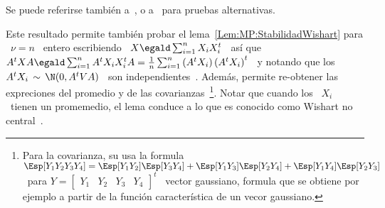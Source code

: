 %
Se    puede   referirse   tambi\'en    a~\cite{GupNag99,   And03,    Seb04},   o
a~\cite[Ej.~7.2]{BilBre99} para pruebas alternativas.

Este resultado  permite tambi\'en probar  el lema~\ref{Lem:MP:StabilidadWishart}
para \  $\nu = n$  \ entero  escribiendo \ $X  \egald \sum_{i=1}^n X_i  X_i^t$ \
as\'i que \ $A^t X A \egald  \sum_{i=1}^n A^t X_i X_i^t A = \frac1n \sum_{i=1}^n
\left( A^t X_i \right) \left( A^t X_i  \right)^t$ \ y notando que los \ $A^t X_i
\, \sim \, \N(0, A^t V A)$ \ son independientes~\cite{Seb04}.  Adem\'as, permite
re-obtener las  expreciones del promedio y de  las covarianzas~\footnote{Para la
  covarianza, su usa la formula \ $\Esp[Y_1 Y_2 Y_3 Y_4] = \Esp[Y_1 Y_2]\Esp[Y_3
  Y_4]  + \Esp[Y_1 Y_3]\Esp[Y_2  Y_4] +  \Esp[Y_1 Y_4]\Esp[Y_2  Y_3]$ \  para $Y
  = \begin{bmatrix}  Y_1 & Y_2 &  Y_3 & Y_4 \end{bmatrix}^t$  \ vector gaussiano,
  formula que se  obtiene por ejemplo a partir  de la funci\'on caracter\'istica
  de un vecor  gaussiano.}. Notar que cuando los \ $X_i$  \ tienen un promemedio,
el  lema conduce  a  lo que  es  conocido como  Wishart no  central~\cite{And03,
  Seb04}.


